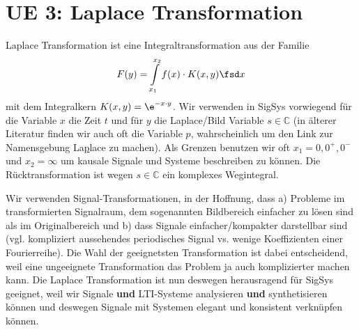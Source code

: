 \clearpage
\section{UE 3: Laplace Transformation}
\label{sec:ue3_laplace}
%
Laplace Transformation ist eine Integraltransformation aus der Familie
\begin{equation}
F(y) = \int\limits_{x_1}^{x_2} f(x) \cdot K(x,y) \fsd x
\end{equation}
mit dem Integralkern $K(x,y) = \e^{-x \cdot y}$.
Wir verwenden in SigSys vorwiegend für die Variable $x$ die Zeit $t$ und für
$y$ die Laplace/Bild Variable $s\in\mathbb{C}$ (in älterer Literatur finden
wir auch oft die Variable $p$, wahrscheinlich um den Link zur Namensgebung
La\underline{p}lace zu machen).
Als Grenzen benutzen wir oft $x_1={0,0^+,0^-}$ und $x_2=\infty$ um kausale Signale und
Systeme beschreiben zu können.
%
Die Rücktransformation ist wegen $s\in\mathbb{C}$ ein komplexes Wegintegral.

Wir verwenden Signal-Transformationen, in der Hoffnung, dass a) Probleme im
transformierten Signalraum, dem sogenannten Bildbereich einfacher zu lösen
sind als im Originalbereich und b) dass Signale einfacher/kompakter darstellbar
sind (vgl. kompliziert aussehendes periodisches Signal vs. wenige Koeffizienten einer Fourierreihe).
%
Die Wahl der geeignetsten Transformation ist dabei entscheidend, weil eine
ungeeignete Transformation das Problem ja auch komplizierter machen kann.
%
Die Laplace Transformation ist nun deswegen herausragend für SigSys geeignet, weil
wir Signale \textbf{und} LTI-Systeme analysieren \textbf{und} synthetisieren
können und deswegen Signale mit Systemen elegant und konsistent verknüpfen können.


